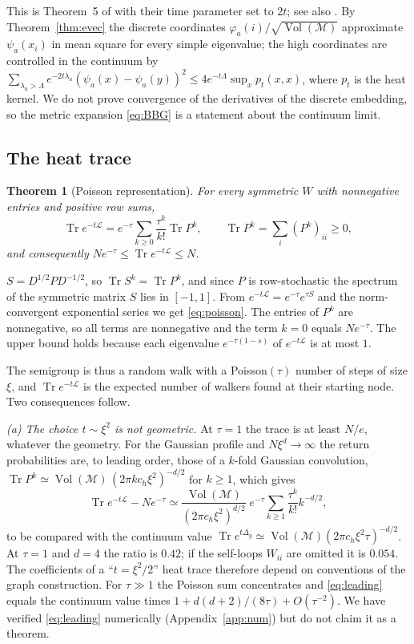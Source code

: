 \documentclass[11pt,a4paper]{article}
\makeatletter
\theoremstyle{stmt}
\newtheorem{theorem}{Theorem}[section]
\theoremstyle{defn}
\theoremstyle{rmk}
\renewenvironment{proof}[1][\proofname]{\par\pushQED{\qed}\normalfont\topsep6\p@\@plus6\p@\relax
  \trivlist\item[\hskip\labelsep{\sffamily\itshape\small #1.}]\ignorespaces}{\popQED\endtrivlist\@endpefalse}
\numberwithin{equation}{section}
\DeclareMathOperator{\Tr}{Tr}
\DeclareMathOperator{\Vol}{Vol}
\newcommand{\M}{\mathcal{M}}
\newcommand{\Lc}{\mathcal{L}}
\makeatother
\begin{document}
This is Theorem~5 of \cite{BBG} with their time parameter set to $2t$; see also \cite{HondaZhu}. By Theorem~\ref{thm:evec} the discrete coordinates $\varphi_a(i)/\sqrt{\Vol(\M)}$ approximate $\psi_a(x_i)$ in mean square for every simple eigenvalue; the high coordinates are controlled in the continuum by $\sum_{\lambda_a>\Lambda}e^{-2t\lambda_a}(\psi_a(x)-\psi_a(y))^2\le4e^{-t\Lambda}\sup_xp_t(x,x)$, where $p_t$ is the heat kernel. We do not prove convergence of the derivatives of the discrete embedding, so the metric expansion \eqref{eq:BBG} is a statement about the continuum limit.

\subsection{The heat trace}

\begin{theorem}[Poisson representation]\label{thm:poisson}
For every symmetric $W$ with nonnegative entries and positive row sums,
\begin{equation}\label{eq:poisson}
\Tr e^{-t\Lc}=e^{-\tau}\sum_{k\ge0}\frac{\tau^k}{k!}\Tr P^k,\qquad \Tr P^k=\sum_i(P^k)_{ii}\ge0,
\end{equation}
and consequently $N e^{-\tau}\le\Tr e^{-t\Lc}\le N$.
\end{theorem}

\begin{proof}
$S=D^{1/2}PD^{-1/2}$, so $\Tr S^k=\Tr P^k$, and since $P$ is row-stochastic the spectrum of the symmetric matrix $S$ lies in $[-1,1]$. From $e^{-t\Lc}=e^{-\tau}e^{\tau S}$ and the norm-convergent exponential series we get \eqref{eq:poisson}. The entries of $P^k$ are nonnegative, so all terms are nonnegative and the term $k=0$ equals $Ne^{-\tau}$. The upper bound holds because each eigenvalue $e^{-\tau(1-s)}$ of $e^{-t\Lc}$ is at most $1$.
\end{proof}

The semigroup is thus a random walk with a Poisson$(\tau)$ number of steps of size $\xi$, and $\Tr e^{-t\Lc}$ is the expected number of walkers found at their starting node. Two consequences follow.

\emph{(a) The choice $t\sim\xi^2$ is not geometric.} At $\tau=1$ the trace is at least $N/e$, whatever the geometry. For the Gaussian profile and $N\xi^d\to\infty$ the return probabilities are, to leading order, those of a $k$-fold Gaussian convolution, $\Tr P^k\simeq\Vol(\M)\,(2\pi kc_h\xi^2)^{-d/2}$ for $k\ge1$, which gives
\begin{equation}\label{eq:leading}
\Tr e^{-t\Lc}-Ne^{-\tau}\simeq\frac{\Vol(\M)}{(2\pi c_h\xi^2)^{d/2}}\;e^{-\tau}\sum_{k\ge1}\frac{\tau^k}{k!}k^{-d/2},
\end{equation}
to be compared with the continuum value $\Tr e^{t\Delta_g}\simeq\Vol(\M)(2\pi c_h\xi^2\tau)^{-d/2}$. At $\tau=1$ and $d=4$ the ratio is $0.42$; if the self-loops $W_{ii}$ are omitted it is $0.054$. The coefficients of a ``$t=\xi^2/2$'' heat trace therefore depend on conventions of the graph construction. For $\tau\gg1$ the Poisson sum concentrates and \eqref{eq:leading} equals the continuum value times $1+d(d+2)/(8\tau)+O(\tau^{-2})$. We have verified \eqref{eq:leading} numerically (Appendix~\ref{app:num}) but do not claim it as a theorem.
\end{document}

